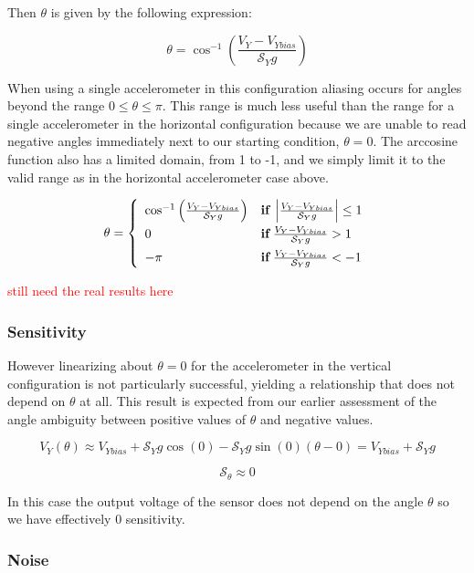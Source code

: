 \documentclass{article}
\newcommand{\xxx}[1]{\textcolor{red}{#1}}
\theoremstyle{plain}
\theoremstyle{definition}
\theoremstyle{remark}
\newcommand{\Sens}{\mathcal{S}}
\begin{document}
Then $\theta$ is given by the following expression:

\begin{equation}
\theta = \cos^{-1}\left( \frac{V_{Y} - V_{Ybias}}{\Sens_{Y} g}\right)
\label{verticalEQ}
\end{equation}

When using a single accelerometer in this configuration aliasing occurs for angles beyond the range $0 \leq \theta \leq \pi$.  This range is much less useful than the range for a single accelerometer in the horizontal configuration because we are unable to read negative angles immediately next to our starting condition, $\theta = 0$.  The arccosine function also has a limited domain, from 1 to -1, and we simply limit it to the valid range as in the horizontal accelerometer case above.

$$\theta = \left\{ 
	\begin{array}{l l}
		\cos^{-1}\left( \frac{V_{Y} - V_{Ybias}}{\Sens_{Y} g}\right) & {\bf{if }} \, \left| \frac{V_{Y} - V_{Ybias}}{\Sens_{Y} g} \right| \leq 1 \\[6pt]
		0 & {\bf{if }} \, \frac{V_{Y} - V_{Ybias}}{\Sens_{Y} g} > 1 \\[6pt]
		-\pi & {\bf{if} } \, \frac{V_{Y} - V_{Ybias}}{\Sens_{Y} g} < -1
	\end{array} \right. $$

\xxx{still need the real results here}

\subsubsection{Sensitivity}

However linearizing about $\theta = 0$ for the accelerometer in the vertical configuration is not particularly successful,  yielding a relationship that does not depend on $\theta$ at all.  This result is expected from our earlier assessment of the angle ambiguity between positive values of $\theta$ and negative values.  

$$V_{Y}(\theta) \approx V_{Ybias} + \Sens_{Y} g \cos(0) - \Sens_{Y} g \sin(0) (\theta - 0) = V_{Ybias} + \Sens_{Y} g $$

$$ \Sens_\theta \approx 0 $$

In this case the output voltage of the sensor does not depend on the angle $\theta$ so we have effectively 0 sensitivity. 

\subsubsection{Noise}
\end{document}
